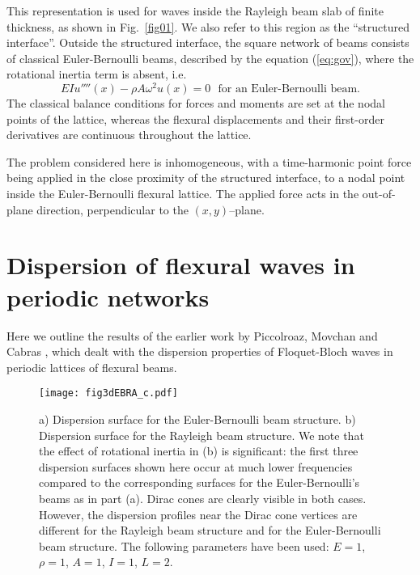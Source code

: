 \documentclass[11pt]{article}
\begin{document}
This representation is used for waves inside the Rayleigh beam slab of finite thickness, as shown in Fig.~\ref{fig01}. We also refer to this region as the ``structured interface''. Outside the structured interface, the square network of beams consists of classical Euler-Bernoulli beams, described by the equation (\ref{eq:gov}), where the rotational inertia term is absent, i.e.
\begin{equation}
\label{eq:govv}
EI u''''(x)  - \rho A \omega^2 u(x) = 0 \ \ \ \mbox{for an Euler-Bernoulli beam}.
\end{equation}
The classical balance conditions for forces and moments are set at the nodal points of the lattice, whereas the flexural displacements and their first-order derivatives are continuous throughout the lattice.

The problem considered here is inhomogeneous, with a time-harmonic point force being applied in the close proximity of the structured interface, to a nodal point inside the Euler-Bernoulli flexural lattice. The applied force acts in the out-of-plane direction, perpendicular to the $(x, y)$--plane.

\section{Dispersion of flexural waves in periodic networks}
\label{sec03}

Here we outline the results of the earlier work by Piccolroaz, Movchan and Cabras \cite{PMC_2016}, which dealt with the dispersion properties of Floquet-Bloch waves in periodic lattices of flexural beams.

\begin{figure}[!htb]
\centering
\texttt{[image: fig3dEBRA\_c.pdf]}
\caption{\footnotesize a) Dispersion surface for the Euler-Bernoulli  beam structure. b) Dispersion surface for the Rayleigh beam structure.
We note that the effect of rotational inertia in (b) is significant: the first three dispersion surfaces shown here occur at much lower frequencies compared to the corresponding surfaces for the Euler-Bernoulli's beams as in part (a). Dirac cones are clearly visible in both cases. However, the dispersion profiles near the Dirac cone vertices are different for the Rayleigh beam structure and for the Euler-Bernoulli beam structure. The following parameters have been used: $E=1$, $\rho=1$, $A=1$, $I=1$, $L=2$.}
\label{fig3d}
\end{figure}
\end{document}
